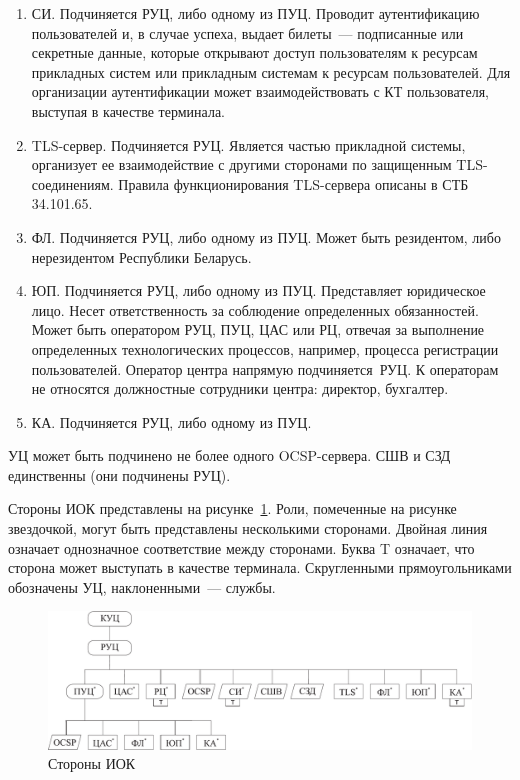 \begin{enumerate}
\item
СИ. Подчиняется РУЦ, либо одному из ПУЦ.
Проводит аутентификацию пользователей и, в случае успеха, выдает билеты~---
подписанные или секретные данные, которые открывают доступ пользователям к 
ресурсам прикладных систем или прикладным системам к ресурсам пользователей.
Для организации аутентификации может взаимодействовать с КТ пользователя,
выступая в качестве терминала.

\item
TLS-сервер. Подчиняется РУЦ.
Является частью прикладной системы, организует ее взаимодействие 
с другими сторонами по защищенным TLS-соединениям. 
Правила функционирования TLS-сервера описаны в СТБ 34.101.65.

\item
ФЛ. Подчиняется РУЦ, либо одному из ПУЦ.
Может быть резидентом, либо нерезидентом Республики Беларусь.

\item
ЮП. Подчиняется РУЦ, либо одному из ПУЦ.
Представляет юридическое лицо. Несет ответственность 
за соблюдение определенных обязанностей.
%
Может быть оператором РУЦ, ПУЦ, ЦАС или РЦ, 
отвечая за выполнение определенных технологических процессов,
например, процесса регистрации пользователей.  
%
Оператор центра напрямую подчиняется~РУЦ.
К операторам не относятся должностные сотрудники центра:
директор, бухгалтер.

\item
КА. Подчиняется РУЦ, либо одному из ПУЦ.
\end{enumerate}

УЦ может быть подчинено не более одного OCSP-сервера.
СШВ и СЗД единственны (они подчинены РУЦ). 

Стороны ИОК представлены на рисунке~\ref{Fig.ENTITIES.1}.
Роли, помеченные на рисунке звездочкой, могут быть представлены 
несколькими сторонами. Двойная линия означает однозначное соответствие 
между сторонами. Буква T означает, что сторона может выступать в качестве 
терминала. Скругленными прямоугольниками обозначены УЦ, наклоненными~--- службы.

\begin{figure}[bht]
\begin{center}
\includegraphics[width=17cm]{../figs/entities}
\end{center}
\caption{Стороны ИОК}
\label{Fig.ENTITIES.1}
\end{figure}

